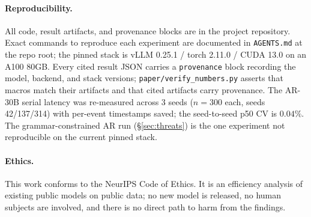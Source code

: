 \paragraph{Reproducibility.}

All code, result artifacts, and provenance blocks are in the project
repository. Exact commands to reproduce each experiment are documented
in \texttt{AGENTS.md} at the repo root; the pinned stack is
vLLM 0.25.1 / torch 2.11.0 / CUDA 13.0 on an A100 80GB. Every cited
result JSON carries a \texttt{provenance} block recording the model,
backend, and stack versions; \texttt{paper/verify\_numbers.py} asserts
that macros match their artifacts and that cited artifacts carry
provenance. The AR-30B serial latency was re-measured across 3 seeds
($n{=}300$ each, seeds 42/137/314) with per-event timestamps saved;
the seed-to-seed p50 CV is $0.04\%$. The grammar-constrained AR run
(\S\ref{sec:threats}) is the one experiment not reproducible on the
current pinned stack.

\paragraph{Ethics.}

This work conforms to the NeurIPS Code of Ethics. It is an efficiency
analysis of existing public models on public data; no new model is
released, no human subjects are involved, and there is no direct path
to harm from the findings.

